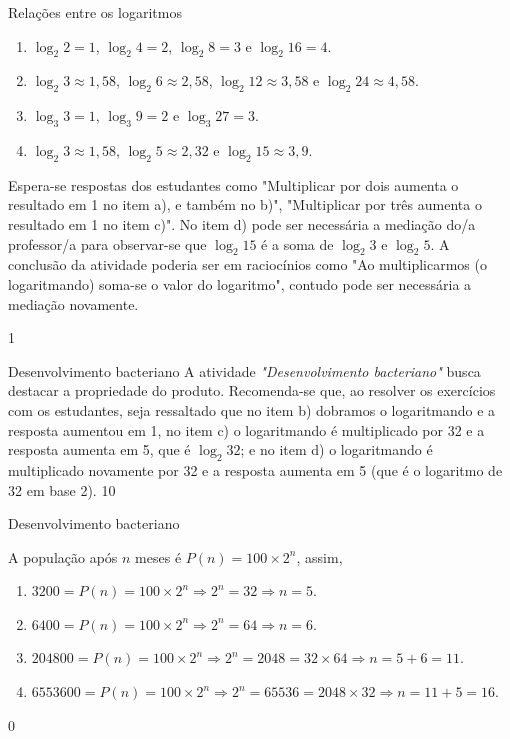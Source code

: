 \begin{answer}{Relações entre os logaritmos}
{
	\begin{enumerate}
	\item $\log_2 2 = 1$, $\log_2 4 = 2$, $\log_2 8 = 3$ e $\log_2 16 = 4$.
	\item $\log_2 3 \approx 1{,}58$, $\log_2 6 \approx 2{,}58$, $\log_2 12 \approx 3{,}58$ e $\log_2 24 \approx 4{,}58$.
	\item $\log_3 3 = 1$, $\log_3 9 = 2$ e $\log_3 27 = 3$.
	\item $\log_2 3 \approx 1{,}58$, $\log_2 5 \approx 2{,}32$ e $\log_2 15 \approx 3{,}9$.
	\end{enumerate}


	Espera-se respostas dos estudantes como "Multiplicar por dois aumenta o resultado em 1 no item a), e também no b)", "Multiplicar por três aumenta o resultado em 1 no item c)". No item d) pode ser necessária a mediação do/a professor/a para observar-se que $\log _2 15$ é a soma de $\log _2 3$ e $\log _2 5$. A conclusão da atividade poderia ser em raciocínios como "Ao multiplicarmos (o logaritmando) soma-se o valor do logaritmo", contudo pode ser necessária a mediação novamente.
}{1}
\end{answer}
\clearmargin
\begin{sugestions}{Desenvolvimento bacteriano}
{
	A atividade \textit{"Desenvolvimento bacteriano"} busca destacar a propriedade do produto. Recomenda-se que, ao resolver os exercícios com os estudantes, seja ressaltado que no item b) dobramos o logaritmando e a resposta aumentou em 1, no item c) o logaritmando é multiplicado por 32 e a resposta aumenta em 5, que é $\log_2 32$; e no item d) o logaritmando é multiplicado novamente por 32 e a resposta aumenta em 5 (que é o logaritmo de 32 em base 2).
}{1}{0}
\end{sugestions}
\begin{answer}{Desenvolvimento bacteriano}
{
	A população após $n$ meses é $P(n) = 100 \times 2^n$, assim,
	\begin{enumerate}[label = \alph*)]
	\item $3200 = P(n) = 100 \times 2^n \Rightarrow 2^n = 32 \Rightarrow n=5$.
	\item $6400 = P(n) = 100 \times 2^n \Rightarrow 2^n = 64 \Rightarrow n=6$.
	\item $204800 = P(n) = 100 \times 2^n \Rightarrow 2^n = 2048 = 32 \times 64 \Rightarrow n=5+6=11$.
	\item $6553600 = P(n) = 100 \times 2^n \Rightarrow 2^n = 65536 = 2048 \times 32 \Rightarrow n=11+5=16$.
	\end{enumerate}
}{0}
\end{answer}
